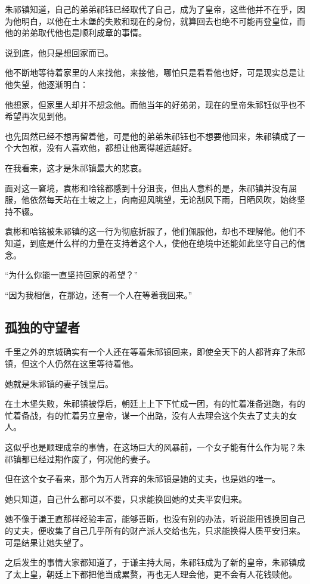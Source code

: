 \begin{multicols}{\theparacolNo}
朱祁镇知道，自己的弟弟祁钰已经取代了自己，成为了皇帝，这些他并不在乎，因为他明白，以他在土木堡的失败和现在的身份，就算回去也绝不可能再登皇位，而他的弟弟取代他也是顺利成章的事情。

说到底，他只是想回家而已。

他不断地等待着家里的人来找他，来接他，哪怕只是看看他也好，可是现实总是让他失望，他逐渐明白：

他想家，但家里人却并不想念他。而他当年的好弟弟，现在的皇帝朱祁钰似乎也不希望再次见到他。

也先固然已经不想再留着他，可是他的弟弟朱祁钰也不想要他回来，朱祁镇成了一个大包袱，没有人喜欢他，都想让他离得越远越好。

在我看来，这才是朱祁镇最大的悲哀。

面对这一窘境，袁彬和哈铭都感到十分沮丧，但出人意料的是，朱祁镇并没有屈服，他依然每天站在土坡之上，向南迎风眺望，无论刮风下雨，日晒风吹，始终坚持不辍。

袁彬和哈铭被朱祁镇的这一行为彻底折服了，他们佩服他，却也不理解他。他们不知道，到底是什么样的力量在支持着这个人，使他在绝境中还能如此坚守自己的信念。

“为什么你能一直坚持回家的希望？”

“因为我相信，在那边，还有一个人在等着我回来。”

\subsection{孤独的守望者}
千里之外的京城确实有一个人还在等着朱祁镇回来，即使全天下的人都背弃了朱祁镇，但这个人仍然在这里等待着他。

她就是朱祁镇的妻子钱皇后。

在土木堡失败，朱祁镇被俘后，朝廷上上下下忙成一团，有的忙着准备逃跑，有的忙着备战，有的忙着另立皇帝，谋一个出路，没有人去理会这个失去了丈夫的女人。

这似乎也是顺理成章的事情，在这场巨大的风暴前，一个女子能有什么作为呢？朱祁镇都已经过期作废了，何况他的妻子。

但在这个女子看来，那个为万人背弃的朱祁镇是她的丈夫，也是她的唯一。

她只知道，自己什么都可以不要，只求能换回她的丈夫平安归来。

她不像于谦王直那样经验丰富，能够善断，也没有别的办法，听说能用钱换回自己的丈夫，便收集了自己几乎所有的财产派人交给也先，只求能换得人质平安归来。可是结果让她失望了。

之后发生的事情大家都知道了，于谦主持大局，朱祁钰成为了新的皇帝，朱祁镇成了太上皇，朝廷上下都把他当成累赘，再也无人理会他，更不会有人花钱赎他。


\end{multicols}
